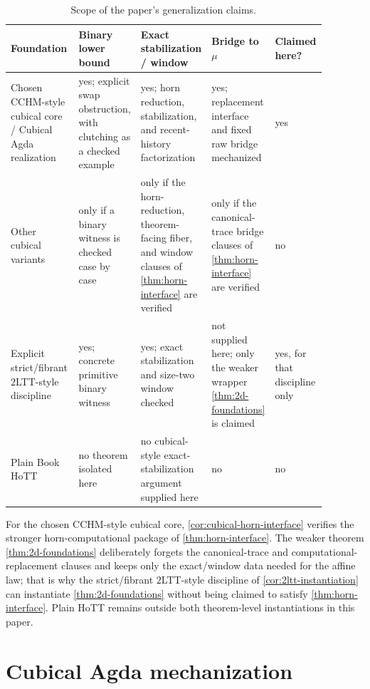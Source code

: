 \documentclass{lmcs}
\begin{document}
\begin{table}[t]
\centering
\caption{Scope of the paper's generalization claims.}
\label{tab:foundation-scope}
\small
\begin{tabular}{@{}p{0.24\linewidth}p{0.18\linewidth}p{0.19\linewidth}p{0.18\linewidth}p{0.09\linewidth}@{}}
\toprule
Foundation & Binary lower bound & Exact stabilization / window & Bridge to $\mu$ & Claimed here? \\
\midrule
Chosen CCHM-style cubical core / Cubical Agda realization & yes; explicit swap obstruction, with clutching as a checked example & yes; horn reduction, stabilization, and recent-history factorization & yes; replacement interface and fixed raw bridge mechanized & yes \\
Other cubical variants & only if a binary witness is checked case by case & only if the horn-reduction, theorem-facing fiber, and window clauses of \autoref{thm:horn-interface} are verified & only if the canonical-trace bridge clauses of \autoref{thm:horn-interface} are verified & no \\
Explicit strict/fibrant $2$LTT-style discipline & yes; concrete primitive binary witness & yes; exact stabilization and size-two window checked & not supplied here; only the weaker wrapper \autoref{thm:2d-foundations} is claimed & yes, for that discipline only \\
Plain Book HoTT & no theorem isolated here & no cubical-style exact-stabilization argument supplied here & no & no \\
\bottomrule
\end{tabular}
\end{table}

For the chosen CCHM-style cubical core, \autoref{cor:cubical-horn-interface} verifies the stronger horn-computational package of \autoref{thm:horn-interface}. The weaker theorem \autoref{thm:2d-foundations} deliberately forgets the canonical-trace and computational-replacement clauses and keeps only the exact/window data needed for the affine law; that is why the strict/fibrant $2$LTT-style discipline of \autoref{cor:2ltt-instantiation} can instantiate \autoref{thm:2d-foundations} without being claimed to satisfy \autoref{thm:horn-interface}. Plain HoTT remains outside both theorem-level instantiations in this paper.

\section{Cubical Agda mechanization}
\label{sec:mechanization}
\end{document}

